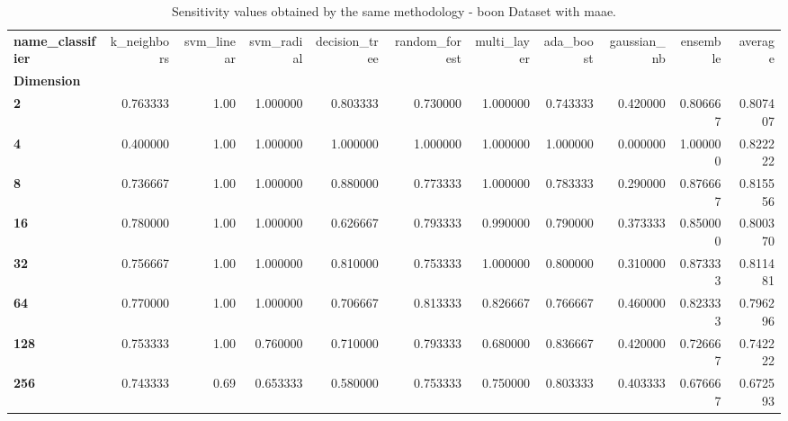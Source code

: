 \begin{table}
\centering
\caption{Sensitivity values obtained by the same methodology - boon Dataset with maae.}
\label{sensitivity_boon_maae-reproduction}
\begin{tabular}{lrrrrrrrrrr}
\toprule
\textbf{name\_classifier} &  k\_neighbors &  svm\_linear &  svm\_radial &  decision\_tree &  random\_forest &  multi\_layer &  ada\_boost &  gaussian\_nb &  ensemble &   average \\
\textbf{Dimension} &              &             &             &                &                &              &            &              &           &           \\
\midrule
\textbf{2        } &     0.763333 &        1.00 &    1.000000 &       0.803333 &       0.730000 &     1.000000 &   0.743333 &     0.420000 &  0.806667 &  0.807407 \\
\textbf{4        } &     0.400000 &        1.00 &    1.000000 &       1.000000 &       1.000000 &     1.000000 &   1.000000 &     0.000000 &  1.000000 &  0.822222 \\
\textbf{8        } &     0.736667 &        1.00 &    1.000000 &       0.880000 &       0.773333 &     1.000000 &   0.783333 &     0.290000 &  0.876667 &  0.815556 \\
\textbf{16       } &     0.780000 &        1.00 &    1.000000 &       0.626667 &       0.793333 &     0.990000 &   0.790000 &     0.373333 &  0.850000 &  0.800370 \\
\textbf{32       } &     0.756667 &        1.00 &    1.000000 &       0.810000 &       0.753333 &     1.000000 &   0.800000 &     0.310000 &  0.873333 &  0.811481 \\
\textbf{64       } &     0.770000 &        1.00 &    1.000000 &       0.706667 &       0.813333 &     0.826667 &   0.766667 &     0.460000 &  0.823333 &  0.796296 \\
\textbf{128      } &     0.753333 &        1.00 &    0.760000 &       0.710000 &       0.793333 &     0.680000 &   0.836667 &     0.420000 &  0.726667 &  0.742222 \\
\textbf{256      } &     0.743333 &        0.69 &    0.653333 &       0.580000 &       0.753333 &     0.750000 &   0.803333 &     0.403333 &  0.676667 &  0.672593 \\
\bottomrule
\end{tabular}
\end{table}
